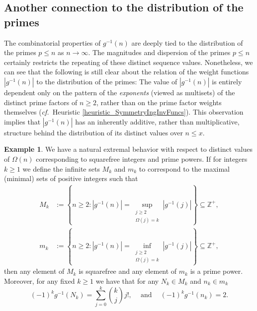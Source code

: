 \documentclass[11pt,reqno,a4letter]{article}
\numberwithin{figure}{section}
\numberwithin{table}{section}
\newcommand{\cf}{\textit{cf.\ }}
\theoremstyle{plain}
\numberwithin{theorem}{section}
\theoremstyle{definition}
\newtheorem{example}[theorem]{Example}
\begin{document}
\subsection{Another connection to the distribution of the primes} 
\label{subSection_AConnectionToDistOfThePrimes} 

The combinatorial properties of $g^{-1}(n)$ are deeply tied to the distribution of the primes 
$p \leq n$ as $n \rightarrow \infty$. 
The magnitudes and dispersion of the primes $p \leq n$ certainly restricts the 
repeating of these distinct sequence values. 
Nonetheless, we can see that the following 
is still clear about the relation of the weight functions $|g^{-1}(n)|$ to the 
distribution of the primes: 
The value of $|g^{-1}(n)|$ is entirely dependent only on the pattern of the \emph{exponents} 
(viewed as multisets) of the distinct prime factors of $n \geq 2$, rather than on the 
prime factor weights themselves 
(\cf Heuristic \ref{heuristic_SymmetryIngInvFuncs}). 
This observation implies that $|g^{-1}(n)|$ has an inherently additive, rather than 
multiplicative, structure behind the distribution of its distinct values over $n \leq x$. 

\begin{example} 
We have a natural extremal behavior with respect to distinct values of $\Omega(n)$ 
corresponding to squarefree integers and prime powers. If for integers 
$k \geq 1$ we define the 
infinite sets $M_k$ and $m_k$ to correspond to the maximal (minimal) sets of 
positive integers such that 
\begin{align*} 
M_k & := \left\{n \geq 2: |g^{-1}(n)| = \underset{{\substack{j \geq 2 \\ \Omega(j) = k}}}{\operatorname{sup}} 
     |g^{-1}(j)|\right\} \subseteq \mathbb{Z}^{+}, \\  
m_k & := \left\{n \geq 2: |g^{-1}(n)| = \underset{{\substack{j \geq 2 \\ \Omega(j) = k}}}{\operatorname{inf}} 
     |g^{-1}(j)|\right\} \subseteq \mathbb{Z}^{+}, 
\end{align*} 
then any element of $M_k$ is squarefree and any element of $m_k$ is a prime power. 
Moreover, for any fixed $k \geq 1$ 
we have that for any $N_k \in M_k$ and $n_k \in m_k$
\[
(-1)^{k} g^{-1}(N_k) = \sum_{j=0}^{k} \binom{k}{j} j!, 
     \quad \mathrm{\ and\ } \quad 
     (-1)^{k} g^{-1}(n_k) = 2. 
\]
\end{example}
\end{document}
